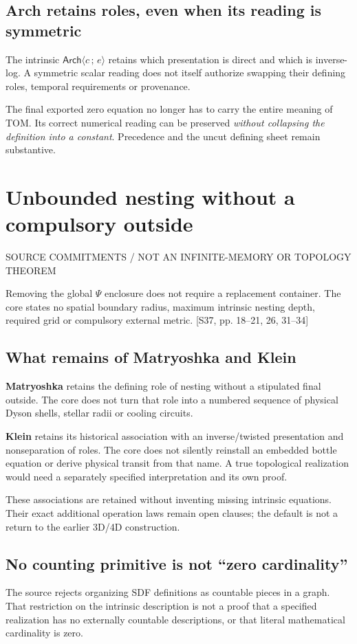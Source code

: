 \documentclass[11pt,a4paper]{article}
\newcommand{\newsec}[2]{\clearpage\section{#1}{\sffamily\footnotesize\color{teal}\MakeUppercase{#2}\par}\vspace{5pt}}
\newcommand{\src}[1]{{\small\color{muted}[S37, #1]}}
\newcommand{\Ar}{\mathsf{Arch}}
\newcommand{\bind}[1]{\langle #1\rangle}
\begin{document}
\subsection{Arch retains roles, even when its reading is symmetric}
The intrinsic $\Ar\bind{c\,;\,e}$ retains which presentation is direct and which is inverse-log. A symmetric scalar reading does not itself authorize swapping their defining roles, temporal requirements or provenance.

\begin{boxx}
The final exported zero equation no longer has to carry the entire meaning of TOM. Its correct numerical reading can be preserved \emph{without collapsing the definition into a constant}. Precedence and the uncut defining sheet remain substantive.
\end{boxx}

\newsec{Unbounded nesting without a compulsory outside}{Source commitments / not an infinite-memory or topology theorem}
Removing the global $\Psi$ enclosure does not require a replacement container. The core states no spatial boundary radius, maximum intrinsic nesting depth, required grid or compulsory external metric. \src{pp. 18--21, 26, 31--34}

\subsection{What remains of Matryoshka and Klein}
\textbf{Matryoshka} retains the defining role of nesting without a stipulated final outside. The core does not turn that role into a numbered sequence of physical Dyson shells, stellar radii or cooling circuits.

\textbf{Klein} retains its historical association with an inverse/twisted presentation and nonseparation of roles. The core does not silently reinstall an embedded bottle equation or derive physical transit from that name. A true topological realization would need a separately specified interpretation and its own proof.

These associations are retained without inventing missing intrinsic equations. Their exact additional operation laws remain open clauses; the default is not a return to the earlier 3D/4D construction.

\subsection{No counting primitive is not ``zero cardinality''}
The source rejects organizing SDF definitions as countable pieces in a graph. That restriction on the intrinsic description is not a proof that a specified realization has no externally countable descriptions, or that literal mathematical cardinality is zero.
\end{document}
